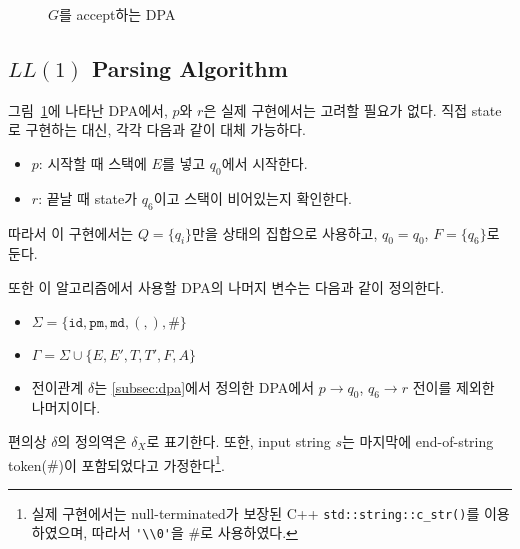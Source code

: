 \documentclass[a4paper,10pt]{scrartcl}
\numberwithin{equation}{section}
\numberwithin{figure}{section}
\numberwithin{table}{section}
\theoremstyle{definition}
\newenvironment{tikzautomata}
{%
  \begin{center}
    \begin{tikzpicture}[
      on grid,auto,thick,>={Stealth[round]},initial text=,
      every state/.style={inner sep=0pt, minimum size=0.75cm, node distance=1.75cm and 2.5cm, font=\normalsize},
      accepting/.style={double distance=2pt,outer sep=1pt},
      proc/.style={circle,draw},
      rloop/.style={in=330,out=30,looseness=5},
      lloop/.style={in=210,out=150,looseness=5},
      ]
  }{%
    \end{tikzpicture}
  \end{center}
}
\begin{document}
\begin{figure}[H]
  \caption{$G$를 accept하는 DPA} \label{fig:dpa}
\end{figure}

\subsection{$LL(1)$ Parsing Algorithm}
\label{subsec:ll1}

그림~\ref{fig:dpa}에 나타난 DPA에서, $p$와 $r$은 실제 구현에서는 고려할 필요가 없다. 직접 state로 구현하는 대신, 각각 다음과 같이 대체 가능하다.
\begin{itemize}
  \item $p$: 시작할 때 스택에 $E$를 넣고 $q_0$에서 시작한다.
  \item $r$: 끝날 때 state가 $q_6$이고 스택이 비어있는지 확인한다.
\end{itemize}
따라서 이 구현에서는 $Q = \{q_i\}$만을 상태의 집합으로 사용하고, $q_0 = q_0$, $F = \{q_6\}$로 둔다.

또한 이 알고리즘에서 사용할 DPA의 나머지 변수는 다음과 같이 정의한다.
\begin{itemize}
  \item $\Sigma = \{\texttt{id}, \texttt{pm}, \texttt{md}, (, ), \#\}$
  \item $\Gamma = \Sigma \cup \{E, E', T, T', F, A\}$
  \item 전이관계 $\delta$는 \ref{subsec:dpa}에서 정의한 DPA에서 $p \to q_0$, $q_6 \to r$ 전이를 제외한 나머지이다.
\end{itemize}
편의상 $\delta$의 정의역은 $\delta_X$로 표기한다. 또한, input string $s$는 마지막에 end-of-string token($\#$)이 포함되었다고 가정한다\footnote{실제 구현에서는 null-terminated가 보장된 C++ \lstinline{std::string::c_str()}를 이용하였으며, 따라서 \lstinline{'\\0'}을 $\#$로 사용하였다.}.
\end{document}
